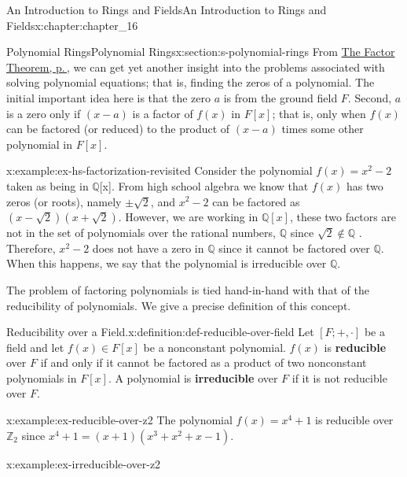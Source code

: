 \documentclass[twoside,10pt,]{book}
\newcommand{\terminology}[1]{\textbf{#1}}
\numberwithin{equation}{section}
\begin{document}
\begin{chapterptx}{An Introduction to Rings and Fields}{}{An Introduction to Rings and Fields}{}{}{x:chapter:chapter_16}
\begin{sectionptx}{Polynomial Rings}{}{Polynomial Rings}{}{}{x:section:s-polynomial-rings}
From \hyperref[x:theorem:theorem-polynomial-factor]{The Factor Theorem, p.\,\pageref{x:theorem:theorem-polynomial-factor}}, we can get yet another insight into the problems associated with solving polynomial equations; that is, finding the zeros of a polynomial. The initial important idea here is that the zero \(a\) is from the ground field \(F\). Second, \(a\) is a zero only if \((x - a)\) is a factor of \(f(x)\) in \(F[x]\); that is, only when \(f(x)\) can be factored (or reduced) to the product of \((x - a)\) times some other polynomial in \(F[x]\).%
\begin{example}{}{x:example:ex-hs-factorization-revisited}%
Consider the polynomial \(f(x) = x^2-2\) taken as being in \(\mathbb{Q}\)[x]. From high school algebra we know that \(f(x)\) has two zeros (or roots), namely \(\pm \sqrt{2}\), and \(x^2 - 2\) can be factored  as \(\left(x - \sqrt{2}\right) \left(x + \sqrt{2}\right)\). However, we are working in \(\mathbb{Q}[x]\), these two factors are not in the set of polynomials over the rational numbers, \(\mathbb{Q}\)  since \(\sqrt{2} \notin \mathbb{Q}\) .   Therefore, \(x^2 - 2\) does not have a zero in \(\mathbb{Q}\) since it cannot be factored over \(\mathbb{Q}\). When this happens, we say that the polynomial is irreducible over \(\mathbb{Q}\).%
\end{example}
The problem of factoring polynomials is tied hand-in-hand with that of the reducibility of polynomials. We give a precise definition of this concept.%
\begin{definition}{Reducibility over a Field.}{x:definition:def-reducible-over-field}%
%
%
%
Let \([F; +, \cdot]\)  be a field and let \(f(x) \in F[x]\) be a nonconstant polynomial. \(f(x)\) is  \terminology{reducible} over \(F\) if and only if it cannot be factored as a product of two nonconstant polynomials in \(F[x]\). A polynomial is \terminology{irreducible} over  \(F\) if it is not reducible over \(F\).%
\end{definition}
\begin{example}{}{x:example:ex-reducible-over-z2}%
The polynomial \(f(x) = x^4 + 1\)  is reducible over  \(\mathbb{Z}_2\) since \(x^4 + 1 = (x + 1)\left(x^3 + x^2 + x - 1\right).\)%
\end{example}
\begin{example}{}{x:example:ex-irreducible-over-z2}%

\end{example}
\end{sectionptx}
\end{chapterptx}
\end{document}
